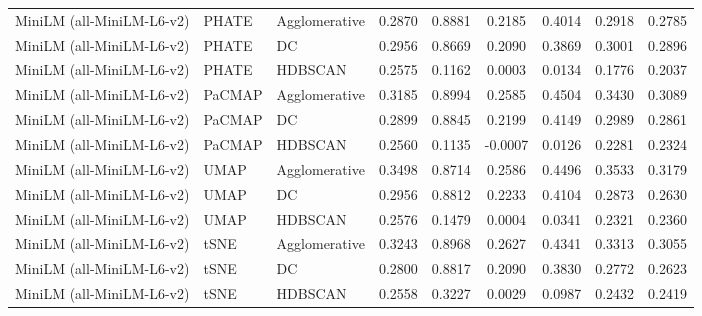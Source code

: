 \begin{table}[t]
\begin{tabular}{lllcccccc}
MiniLM (all-MiniLM-L6-v2) & PHATE & Agglomerative & 0.2870 & 0.8881 & 0.2185 & 0.4014 & 0.2918 & 0.2785 \\
MiniLM (all-MiniLM-L6-v2) & PHATE & DC & 0.2956 & 0.8669 & 0.2090 & 0.3869 & 0.3001 & 0.2896 \\
MiniLM (all-MiniLM-L6-v2) & PHATE & HDBSCAN & 0.2575 & 0.1162 & 0.0003 & 0.0134 & 0.1776 & 0.2037 \\

MiniLM (all-MiniLM-L6-v2) & PaCMAP & Agglomerative & 0.3185 & 0.8994 & 0.2585 & 0.4504 & 0.3430 & 0.3089 \\
MiniLM (all-MiniLM-L6-v2) & PaCMAP & DC & 0.2899 & 0.8845 & 0.2199 & 0.4149 & 0.2989 & 0.2861 \\
MiniLM (all-MiniLM-L6-v2) & PaCMAP & HDBSCAN & 0.2560 & 0.1135 & -0.0007 & 0.0126 & 0.2281 & 0.2324 \\

MiniLM (all-MiniLM-L6-v2) & UMAP & Agglomerative & 0.3498 & 0.8714 & 0.2586 & 0.4496 & 0.3533 & 0.3179 \\
MiniLM (all-MiniLM-L6-v2) & UMAP & DC & 0.2956 & 0.8812 & 0.2233 & 0.4104 & 0.2873 & 0.2630 \\
MiniLM (all-MiniLM-L6-v2) & UMAP & HDBSCAN & 0.2576 & 0.1479 & 0.0004 & 0.0341 & 0.2321 & 0.2360 \\

MiniLM (all-MiniLM-L6-v2) & tSNE & Agglomerative & 0.3243 & 0.8968 & 0.2627 & 0.4341 & 0.3313 & 0.3055 \\
MiniLM (all-MiniLM-L6-v2) & tSNE & DC & 0.2800 & 0.8817 & 0.2090 & 0.3830 & 0.2772 & 0.2623 \\
MiniLM (all-MiniLM-L6-v2) & tSNE & HDBSCAN & 0.2558 & 0.3227 & 0.0029 & 0.0987 & 0.2432 & 0.2419 \\


\bottomrule
\end{tabular}
\end{table}
